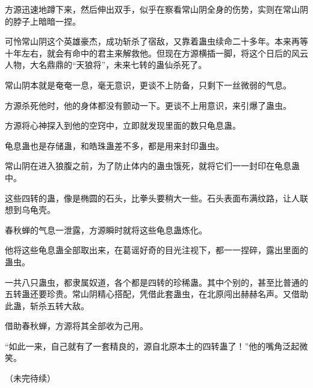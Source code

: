 \begin{this_body}
方源迅速地蹲下来，然后伸出双手，似乎在察看常山阴全身的伤势，实则在常山阴的脖子上暗暗一捏。

可怜常山阴这个英雄豪杰，成功斩杀了宿敌，又靠着蛊虫续命二十多年。本来再等十年左右，就会有命中的君主来解救他。但现在方源横插一脚，将这个日后的风云人物，大名鼎鼎的“天狼将”，未来七转的蛊仙杀死了。

常山阴本就是奄奄一息，毫无意识，更谈不上防备，只剩下一丝微弱的气息。

方源杀死他时，他的身体都没有颤动一下。更谈不上用意识，来引爆了蛊虫。

方源将心神探入到他的空窍中，立即就发现里面的数只龟息蛊。

龟息蛊也是存储蛊，和皓珠蛊差不多，都是用来封印蛊虫。

常山阴在进入狼腹之前，为了防止体内的蛊虫饿死，就将它们一一封印在龟息蛊中。

这些四转的蛊，像是椭圆的石头，比拳头要稍大一些。石头表面布满纹路，让人联想到乌龟壳。

春秋蝉的气息一泄露，方源瞬时就将这些龟息蛊炼化。

他将这些龟息蛊全部取出来，在葛谣好奇的目光注视下，都一一捏碎，露出里面的蛊虫。

一共八只蛊虫，都隶属奴道，各个都是四转的珍稀蛊。其中个别的，甚至比普通的五转蛊还要珍贵。常山阴精心搭配，凭借此套蛊虫，在北原闯出赫赫名声。又借助此蛊，斩杀五转大敌。

借助春秋蝉，方源将其全部收为己用。

“如此一来，自己就有了一套精良的，源自北原本土的四转蛊了！”他的嘴角泛起微笑。

（未完待续）

\end{this_body}

